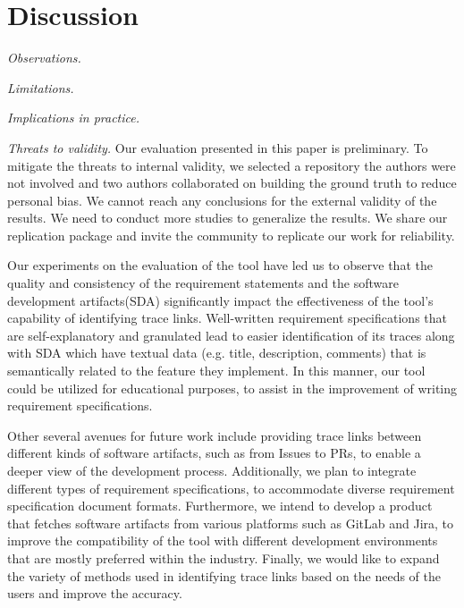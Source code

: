 \section{Discussion}
\label{sec:discuss}

\emph{Observations.}

\emph{Limitations.}

\emph{Implications in practice.}

\emph{Threats to validity.} Our evaluation presented in this paper is preliminary. To mitigate the threats to internal validity, we selected a repository the authors were not involved and two authors collaborated on building the ground truth to reduce personal bias. We cannot reach any conclusions for the external validity of the results. We need to conduct more studies to generalize the results. We share our replication package and invite the community to replicate our work for reliability.



Our experiments on the evaluation of the tool have led us to observe that the quality and consistency of the requirement statements and the software development artifacts(SDA) significantly impact the effectiveness of the tool's capability of identifying trace links. Well-written requirement specifications that are self-explanatory and granulated lead to easier identification of its traces along with SDA which have textual data (e.g. title, description, comments) that is semantically related to the feature they implement. In this manner, our tool could be utilized for educational purposes, to assist in the improvement of writing requirement specifications.


Other several avenues for future work include providing trace links between different kinds of software artifacts, such as from Issues to PRs, to enable a deeper view of the development process. Additionally, we plan to integrate different types of requirement specifications, to accommodate diverse requirement specification document formats. Furthermore, we intend to develop a product that fetches software artifacts from various platforms such as GitLab and Jira, to improve the compatibility of the tool with different development environments that are mostly preferred within the industry. Finally, we would like to expand the variety of methods used in identifying trace links based on the needs of the users and improve the accuracy.

